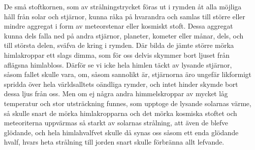 \documentclass[a4paper, 12pt, oneside, swedish]{article}
\begin{document}
De små stoftkornen, som av strålningstrycket föras ut i rymden åt alla möjliga håll från solar och stjärnor, kunna råka på hvarandra och samlas till större eller mindre aggregat i form av meteorstenar eller kosmiskt stoft. Dessa aggregat kunna dels falla ned på andra stjärnor, planeter, kometer eller månar, dels, och till största delen, sväfva de kring i rymden. Där bilda de jämte större mörka himlakroppar ett slags dimma, som för oss delvis skymmer bort ljuset från aflägsna himlabloss. Därför se vi icke hela himlen täckt av lysande stjärnor, såsom fallet skulle vara, om, såsom sannolikt är, stjärnorna äro ungefär likformigt spridda över hela världsalltets oändliga rymder, och intet hinder skymde bort dessa ljus från oss. Men om ej några andra himmelskroppar av mycket låg temperatur och stor utsträckning funnes, som upptoge de lysande solarnas värme, så skulle snart de mörka himlakropparna och det mörka kosmiska stoftet och meteoriterna uppvärmas så starkt av solarnas strålning, att även de blefve glödande, och hela himlahvalfvet skulle då synas oss såsom ett enda glödande hvalf, hvars heta strålning till jorden snart skulle förbränna allt lefvande.
\end{document}
